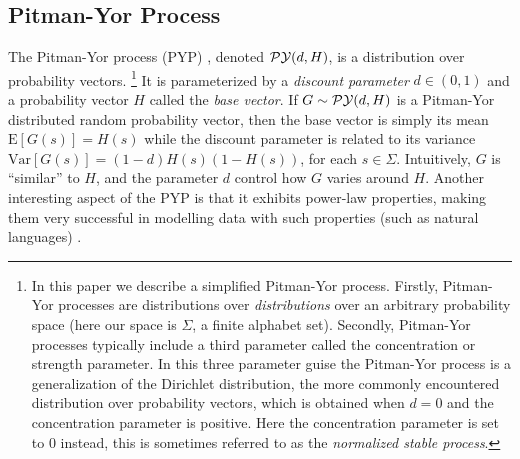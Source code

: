 \subsection{Pitman-Yor Process}
\label{sec:pitmanyor}
The Pitman-Yor process (PYP) \citep{Pitman:AP97}, denoted $\py(d,H)$, is a
distribution over probability vectors.%
\footnote{In this paper we describe a simplified Pitman-Yor process.  Firstly,
Pitman-Yor processes are distributions over \emph{distributions} over an
arbitrary probability space (here our space is $\Sigma$, a finite alphabet
set).  Secondly, Pitman-Yor processes typically include a third parameter
called the concentration or strength parameter.  In this three parameter guise
the Pitman-Yor process is a generalization of the Dirichlet distribution, the
more commonly encountered distribution over probability vectors, which is
obtained when $d=0$ and the concentration parameter is positive.  Here the
concentration parameter is set to 0 instead, this is sometimes referred to as
the \emph{normalized stable process}.}
It is parameterized by a \emph{discount parameter} $d \in (0,1)$ and a
probability vector $H$ called the \emph{base vector}.  If $G\sim\py(d,H)$ is a
Pitman-Yor distributed random probability vector, then the base vector is
simply its mean $\text{E}[G(s)]=H(s)$ while the discount parameter is related
to its variance $\text{Var}[G(s)]=(1-d)H(s)(1-H(s))$, for each $s\in\Sigma$.
%
Intuitively, $G$ is ``similar'' to $H$, and the parameter $d$ control how $G$
varies around $H$.  Another interesting aspect of the PYP is that it exhibits
power-law properties, making them very successful in modelling data with such
properties (such as natural languages) \citep{Teh:ACL06}.


